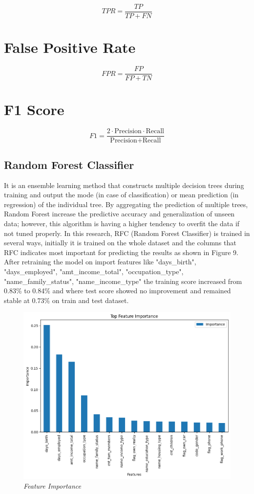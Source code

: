 \documentclass[10pt]{article}
\begin{document}
\begin{multicols}{2}
\[
TPR = \frac{TP}{TP + FN}
\]

\section*{False Positive Rate}

\[
FPR = \frac{FP}{FP + TN}
\]

\section*{F1 Score}

\[
F1 = \frac{2 \cdot \text{Precision} \cdot \text{Recall}}{\text{Precision} + \text{Recall}}
\]


\subsection{Random Forest Classifier}
It is an ensemble learning method that constructs multiple decision trees during training and output the mode (in case of classification) or mean prediction (in regression) of the individual tree. By aggregating the prediction of multiple trees, Random Forest increase the predictive accuracy and generalization of unseen data; however, this algorithm is having a higher tendency to overfit the data if not tuned properly. In this research, RFC (Random Forest Classifier) is trained in several ways, initially it is trained on the whole dataset and 	 the columns that RFC indicates most important for predicting the results as shown in Figure 9. After retraining the model on import features like "days\_birth", "days\_employed",
                              "amt\_income\_total", "occupation\_type", "name\_family\_status", "name\_income\_type" the training score increased from 0.83\% to 0.84\% and where test score showed no improvement and remained stable at 0.73\% on train and test dataset. 

\begin{figure}[H]
    \centering
    \includegraphics[width=1\linewidth]{figure10.png}
    \caption{\justifying \textit{Feature Importance}}
    \label{fig:PID Fuzzy}
\end{figure}


\end{multicols}
\end{document}
